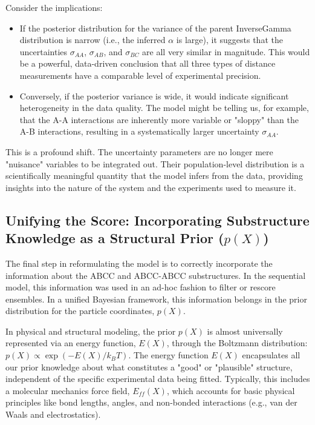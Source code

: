 \documentclass{article}
\begin{document}
Consider the implications:
\begin{itemize}
  \item If the posterior distribution for the variance of the parent InverseGamma distribution is narrow (i.e., the inferred $\alpha$ is large), it suggests that the uncertainties $\sigma_{AA}$, $\sigma_{AB}$, and $\sigma_{BC}$ are all very similar in magnitude. This would be a powerful, data-driven conclusion that all three types of distance measurements have a comparable level of experimental precision.
  \item Conversely, if the posterior variance is wide, it would indicate significant heterogeneity in the data quality. The model might be telling us, for example, that the A-A interactions are inherently more variable or "sloppy" than the A-B interactions, resulting in a systematically larger uncertainty $\sigma_{AA}$.
\end{itemize}

This is a profound shift. The uncertainty parameters are no longer mere "nuisance" variables to be integrated out. Their population-level distribution is a scientifically meaningful quantity that the model infers from the data, providing insights into the nature of the system and the experiments used to measure it.

\subsection{Unifying the Score: Incorporating Substructure Knowledge as a Structural Prior ($p(X)$)}

The final step in reformulating the model is to correctly incorporate the information about the ABCC and ABCC-ABCC substructures. In the sequential model, this information was used in an ad-hoc fashion to filter or rescore ensembles. In a unified Bayesian framework, this information belongs in the prior distribution for the particle coordinates, $p(X)$.

In physical and structural modeling, the prior $p(X)$ is almost universally represented via an energy function, $E(X)$, through the Boltzmann distribution: $p(X) \propto \exp(-E(X)/k_B T)$.\cite{ref10} The energy function $E(X)$ encapsulates all our prior knowledge about what constitutes a "good" or "plausible" structure, independent of the specific experimental data being fitted. Typically, this includes a molecular mechanics force field, $E_{ff}(X)$, which accounts for basic physical principles like bond lengths, angles, and non-bonded interactions (e.g., van der Waals and electrostatics).\cite{ref19}
\end{document}
